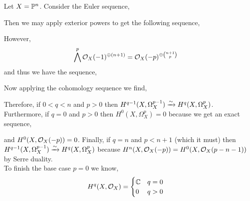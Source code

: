 \documentclass[12pt]{article}
\begin{document}
Let $X = \P^n$. Consider the Euler sequence,
\begin{center}
\end{center}
Then we may apply exterior powers to get the following sequence,
\begin{center}
\end{center}
However, 
\[ \bigwedge^p \struct{X}(-1)^{\oplus (n+1)} = \struct{X}(-p)^{\oplus { n + 1 \choose p }} \] 
and thus we have the sequence,
\begin{center}
\end{center}
Now applying the cohomology sequence we find,
\begin{center}
\end{center}
Therefore, if $0 < q < n$ and $p > 0$ then $H^{q-1}(X, \Omega^{p-1}_{X}) \iso H^q(X, \Omega^p_{X})$. Furthermore, if $q = 0$ and $p > 0$ then $H^0(X, \Omega^p_{X}) = 0$ because we get an exact sequence,
\begin{center}
\end{center}
and $H^0(X, \struct{X}(-p)) = 0$. Finally, if $q = n$ and $p < n + 1$ (which it must) then $H^{q-1}(X, \Omega_X^{p-1}) \iso H^q(X, \Omega_X^p)$ because $H^n(X, \struct{X}(-p)) = H^0(X, \struct{X}(p - n - 1))$ by Serre duality.
\bigskip\\
To finish the base case $p = 0$ we know,
\[ H^q(X, \struct{X}) = 
\begin{cases}
\C & q = 0
\\
0 & q > 0
\end{cases} \]
\end{document}
